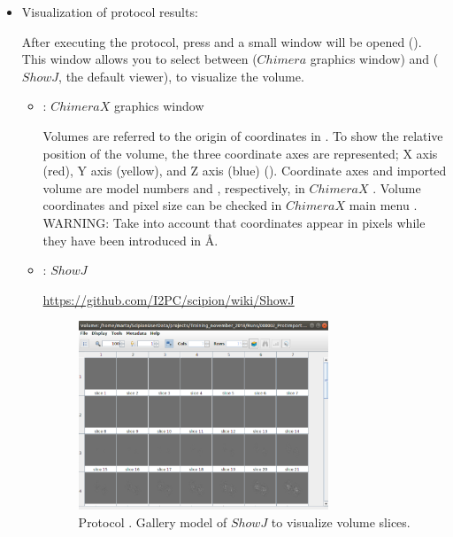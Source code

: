 \begin{itemize}
  \item Visualization of protocol results:
  
  After executing the protocol, press  and a small window will be opened (). This window allows you to select between  ($Chimera$ graphics window) and  ($ShowJ$, the default \scipion viewer), to visualize the volume.
   
   \begin{itemize}
   \item {}: $ChimeraX$ graphics window
   
   Volumes are referred to the origin of coordinates in \chimera. To show the relative position of the volume, the three coordinate axes are represented; X axis (red), Y axis (yellow), and Z axis (blue) (). Coordinate axes and imported volume are model numbers  and , respectively, in $ChimeraX$ . Volume coordinates and pixel size can be checked in $ChimeraX$ main menu . WARNING: Take into account that coordinates appear in pixels while they have been introduced in \AA.
   
  \item {}: $ShowJ$
   
\url{https://github.com/I2PC/scipion/wiki/ShowJ}


   \begin{figure}[H]
   \centering 
    \captionsetup{width=.7\linewidth} 
    \includegraphics[width=0.75\textwidth]{Images_appendix/Fig103.pdf}
    \caption{Protocol . Gallery model of $ShowJ$ to visualize volume slices.}
    \label{fig:app_protocol_volume_4}
   \end{figure}
   

\end{itemize}
\end{itemize}
